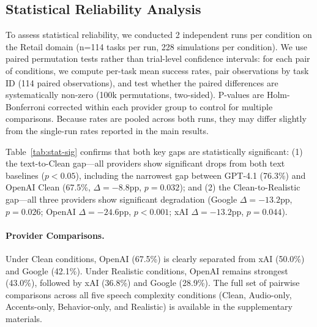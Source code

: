 \subsection{Statistical Reliability Analysis}
\label{app:stat-sig}

To assess statistical reliability, we conducted 2 independent runs per condition on the Retail domain (n=114 tasks per run, 228 simulations per condition). We use paired permutation tests rather than trial-level confidence intervals: for each pair of conditions, we compute per-task mean success rates, pair observations by task ID (114 paired observations), and test whether the paired differences are systematically non-zero (100k permutations, two-sided). P-values are Holm-Bonferroni corrected within each provider group to control for multiple comparisons. Because rates are pooled across both runs, they may differ slightly from the single-run rates reported in the main results.

\begin{table}[h]
\caption{Pairwise statistical significance for Retail domain (2 runs, n=114 tasks each). Text (NR) = GPT-4.1; Text (R) = GPT-5. All $p$-values are Holm-Bonferroni corrected paired permutation tests.}
\label{tab:stat-sig}
\centering
\begin{small}

\end{small}
\end{table}

Table~\ref{tab:stat-sig} confirms that both key gaps are statistically significant: (1) the text-to-Clean gap---all providers show significant drops from both text baselines ($p < 0.05$), including the narrowest gap between GPT-4.1 (76.3\%) and OpenAI Clean (67.5\%, $\Delta = -8.8$pp, $p = 0.032$); and (2) the Clean-to-Realistic gap---all three providers show significant degradation (Google $\Delta = -13.2$pp, $p = 0.026$; OpenAI $\Delta = -24.6$pp, $p < 0.001$; xAI $\Delta = -13.2$pp, $p = 0.044$).

\paragraph{Provider Comparisons.} Under Clean conditions, OpenAI (67.5\%) is clearly separated from xAI (50.0\%) and Google (42.1\%). Under Realistic conditions, OpenAI remains strongest (43.0\%), followed by xAI (36.8\%) and Google (28.9\%). The full set of pairwise comparisons across all five speech complexity conditions (Clean, Audio-only, Accents-only, Behavior-only, and Realistic) is available in the supplementary materials.
